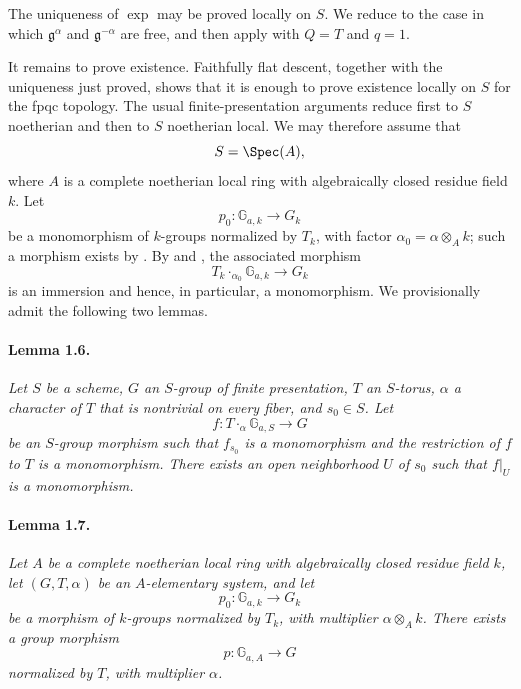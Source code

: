 The uniqueness of \(\exp\) may be proved locally on \(S\). We reduce
to the case in which \(\mathfrak g^\alpha\) and
\(\mathfrak g^{-\alpha}\) are free, and then apply  with
\(Q=T\) and \(q=1\).

It remains to prove existence. Faithfully flat descent, together
with the uniqueness just proved, shows that it is enough to prove
existence locally on \(S\) for the fpqc topology. The usual
finite-presentation arguments reduce first to \(S\) noetherian and
then to \(S\) noetherian local. We may therefore assume that
\[
  S=\Spec(A),
\]
where \(A\) is a complete noetherian local ring with algebraically
closed residue field \(k\). Let
\[
  p_0\colon\mathbb G_{a,k}\longrightarrow G_k
\]
be a monomorphism of \(k\)-groups normalized by \(T_k\), with
factor
\(\alpha_0=\alpha\otimes_A k\); such a morphism exists by .
By  and , the associated morphism
\[
  T_k\mathbin{\cdot_{\alpha_0}}\mathbb G_{a,k}
    \longrightarrow G_k
\]
is an immersion and hence, in particular, a monomorphism. We
provisionally admit the following two lemmas.

\paragraph{\textbf{Lemma 1.6.}}
\emph{Let \(S\) be a scheme, \(G\) an \(S\)-group of finite
presentation, \(T\) an \(S\)-torus, \(\alpha\) a character of \(T\)
that is nontrivial on every fiber, and \(s_0\in S\). Let
\[
  f\colon T\mathbin{\cdot_\alpha}\mathbb G_{a,S}\longrightarrow G
\]
be an \(S\)-group morphism such that \(f_{s_0}\) is a monomorphism
and the restriction of \(f\) to \(T\) is a monomorphism. There
exists an open neighborhood \(U\) of \(s_0\) such that
\(f|_U\) is a monomorphism.}

\paragraph{\textbf{Lemma 1.7.}}
\emph{Let \(A\) be a complete noetherian local ring with
algebraically closed residue field \(k\), let
\((G,T,\alpha)\) be an \(A\)-elementary system, and let
\[
  p_0\colon\mathbb G_{a,k}\longrightarrow G_k
\]
be a morphism of \(k\)-groups normalized by \(T_k\), with
multiplier \(\alpha\otimes_A k\). There exists a group morphism
\[
  p\colon\mathbb G_{a,A}\longrightarrow G
\]
normalized by \(T\), with multiplier \(\alpha\).}


